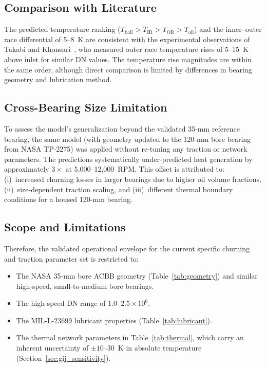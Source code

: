 \documentclass[applsci,article,submit,pdftex,moreauthors]{Definitions/mdpi}
\begin{document}
\subsection{Comparison with Literature}

The predicted temperature ranking ($T_{\text{ball}} > T_{\text{IR}} > T_{\text{OR}} > T_{\text{oil}}$) and the inner--outer race differential of 5--8~K are consistent with the experimental observations of Takabi and Khonsari~\cite{Takabi2013}, who measured outer race temperature rises of 5--15~K above inlet for similar DN values. The temperature rise magnitudes are within the same order, although direct comparison is limited by differences in bearing geometry and lubrication method.

\subsection{Cross-Bearing Size Limitation}
\label{sec:cross}

To assess the model's generalization beyond the validated 35-mm reference bearing, the same model (with geometry updated to the 120-mm bore bearing from NASA TP-2275) was applied without re-tuning any traction or network parameters. The predictions systematically under-predicted heat generation by approximately $3\times$ at 5,000--12,000~RPM. This offset is attributed to: (i)~increased churning losses in larger bearings due to higher oil volume fractions, (ii)~size-dependent traction scaling, and (iii)~different thermal boundary conditions for a housed 120-mm bearing.

\subsection{Scope and Limitations}
\label{sec:scope}

Therefore, the validated operational envelope for the current specific churning and traction parameter set is restricted to:
\begin{itemize}
    \item The NASA 35-mm bore ACBB geometry (Table~\ref{tab:geometry}) and similar high-speed, small-to-medium bore bearings.
    \item The high-speed DN range of $1.0$--$2.5 \times 10^6$.
    \item The MIL-L-23699 lubricant properties (Table~\ref{tab:lubricant}).
    \item The thermal network parameters in Table~\ref{tab:thermal}, which carry an inherent uncertainty of $\pm 10$--$30$~K in absolute temperature (Section~\ref{sec:gij_sensitivity}).
\end{itemize}
\end{document}
